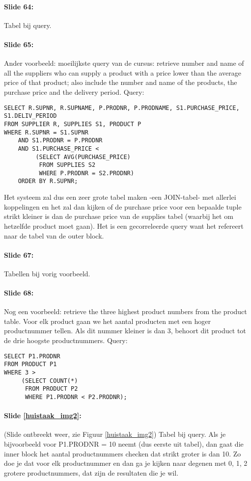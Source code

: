 \documentclass[10pt,a4paper]{report}
\begin{document}
\paragraph{Slide 64:}Tabel bij query.

\paragraph{Slide 65:}Ander voorbeeld: moeilijkste query van de cursus: retrieve number and name of all the suppliers who can supply a product with a price lower than the average price of that product; also include the number and name of the products, the purchase price and the delivery period. Query:
\begin{verbatim}
SELECT R.SUPNR, R.SUPNAME, P.PRODNR, P.PRODNAME, S1.PURCHASE_PRICE, S1.DELIV_PERIOD
FROM SUPPLIER R, SUPPLIES S1, PRODUCT P
WHERE R.SUPNR = S1.SUPNR
    AND S1.PRODNR = P.PRODNR
    AND S1.PURCHASE_PRICE <
         (SELECT AVG(PURCHASE_PRICE)
          FROM SUPPLIES S2
          WHERE P.PRODNR = S2.PRODNR)
    ORDER BY R.SUPNR;
\end{verbatim}
Het systeem zal dus een zeer grote tabel maken -een JOIN-tabel- met allerlei koppelingen en het zal dan kijken of de purchase price voor een bepaalde tuple strikt kleiner is dan de purchase price van de supplies tabel (waarbij het om hetzelfde product moet gaan). Het is een gecorreleerde query want het refereert naar de tabel van de outer block.

\paragraph{Slide 67:}Tabellen bij vorig voorbeeld.

\paragraph{Slide 68:}Nog een voorbeeld: retrieve the three highest product numbers from the product table. Voor elk product gaan we het aantal producten met een hoger productnummer tellen. Als dit nummer kleiner is dan 3, behoort dit product tot de drie hoogste productnummers. Query:
\begin{verbatim}
SELECT P1.PRODNR
FROM PRODUCT P1
WHERE 3 >
     (SELECT COUNT(*)
      FROM PRODUCT P2
      WHERE P1.PRODNR < P2.PRODNR);
\end{verbatim}

\paragraph{Slide \ref{huistaak_img2}:} (Slide ontbreekt weer, zie Figuur \ref{huistaak_img2}) Tabel bij query. Als je bijvoorbeeld voor P1.PRODNR  = 10 neemt (dus eerste uit tabel), dan gaat die inner block het aantal productnummers checken dat strikt groter is dan 10. Zo doe je dat voor elk productnummer en dan ga je kijken naar degenen met 0, 1, 2 grotere productnummers, dat zijn de resultaten die je wil. 
\end{document}
